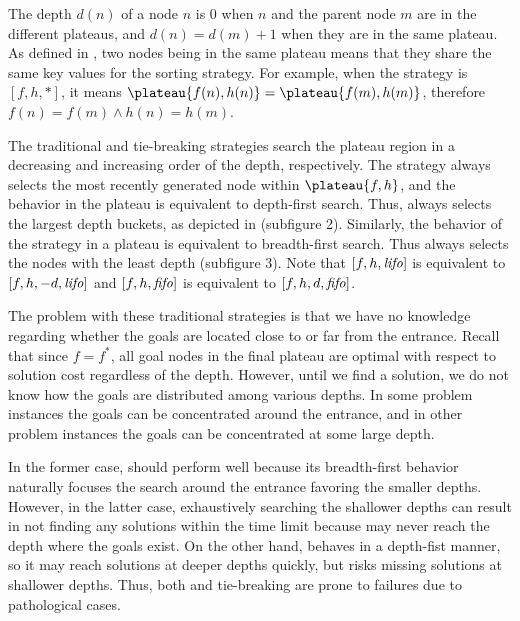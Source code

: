 The depth $d(n)$ of a node $n$ is 0 when $n$ and
the parent node $m$ are in the different plateaus,
and $d(n)=d(m)+1$ when they are in the same plateau.
As defined in , two nodes being in the same plateau
means that they share the same key values for the sorting strategy.
For example, when the strategy is $[f,h,*]$,
it means $\plateau{f(n),h(n)}=\plateau{f(m),h(m)}$, therefore
$f(n) = f(m) \land h(n) = h(m)$.

The traditional \lifo and \fifo tie-breaking strategies
search the plateau region in a decreasing and increasing order of the depth, respectively.
The \lifo strategy always selects the most recently generated node
within $\plateau{f,h}$, and the behavior in the plateau is equivalent to depth-first search.
Thus, \lifo always selects the largest depth
buckets, as depicted in  (subfigure 2).
Similarly, the behavior of the \fifo strategy 
in a plateau is equivalent to breadth-first search. Thus \fifo 
always selects the nodes with the least depth (subfigure 3).
Note that  $[f,h,{\text{\textit{lifo}}}]$ is equivalent to $[f,h,-d,{\text{\textit{lifo}}}]$ and
$[f,h,{\text{\textit{fifo}}}]$ is equivalent to $[f,h,d,{\text{\textit{fifo}}}]$.

The problem with these traditional strategies is that we have no knowledge
regarding whether the goals are located close to or far from the entrance. Recall
that since $f=f^*$, all goal nodes in the final plateau are optimal with respect to solution cost
regardless of the depth.
However, until we find a
solution, we do not know how the goals are distributed among various
depths. In some problem instances the goals can be concentrated around
the entrance, and in other problem instances the goals can be
concentrated at some large depth. %

In the former case, \fifo
should perform well because its breadth-first behavior naturally
focuses the search around the entrance favoring the smaller depths.
However, in the latter case, exhaustively searching
the shallower depths can result in not finding any solutions within
the time limit because \fifo may never reach the depth where the goals
exist.  On the other hand, \lifo behaves in a depth-fist manner, so it
may reach solutions at deeper depths quickly, but risks missing
solutions at shallower depths.  Thus, both \fifo and \lifo tie-breaking
are prone to failures due to pathological cases.

